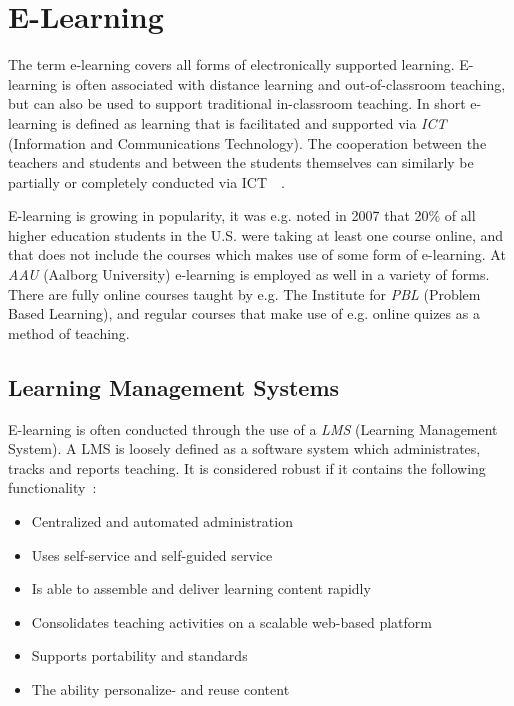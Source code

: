 \section{E-Learning}\label{sec:e-learning}
The term e-learning covers all forms of electronically supported learning. E-learning is often associated with distance learning and out-of-classroom teaching, but can also be used to support traditional in-classroom teaching. In short e-learning is defined as learning that is facilitated and supported via \emph{ICT} (Information and Communications Technology). The cooperation between the teachers and students and between the students themselves can similarly be partially or completely conducted via ICT~\citep{def_e-learning1}~\citep{def_e-learning2}.

E-learning is growing in popularity, it was e.g. noted in 2007 that 20\% of all higher education students in the U.S. were taking at least one course online, and that does not include the courses which makes use of some form of e-learning.	At \emph{AAU} (Aalborg University) e-learning is employed as well in a variety of forms. There are fully online courses taught by e.g. The Institute for \emph{PBL} (Problem Based Learning)\cite{mpbl}, and regular courses that make use of e.g. online quizes as a method of teaching. 

\subsection{Learning Management Systems}
\label{sub:lms}
E-learning is often conducted through the use of a \emph{LMS} (Learning Management System). A LMS is loosely defined as a software system which administrates, tracks and reports teaching. It is considered robust if it contains the following functionality~\citep{Ellis09}:

\begin{itemize}
	\item Centralized and automated administration
	\item Uses self-service and self-guided service
	\item Is able to assemble and deliver learning content rapidly
	\item Consolidates teaching activities on a scalable web-based platform
	\item Supports portability and standards
	\item The ability personalize- and reuse content
\end{itemize}

